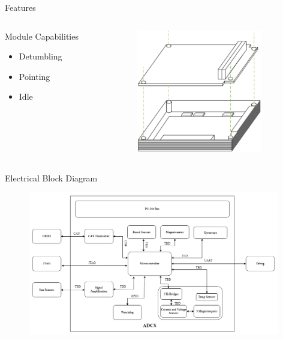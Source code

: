 \documentclass{beamer}
\begin{document}
\begin{frame}{Features}
    \begin{columns}[t]
        \begin{column}[t]{0.5\textwidth}
        \item Module Capabilities
        \vspace{0.3cm}
            \begin{itemize}
                \item Detumbling
                \vspace{0.3cm}
                \item Pointing
                \vspace{0.3cm}
                \item Idle
                \vspace{0.3cm}
            \end{itemize}
        \end{column}
        \begin{column}[t]{0.5\textwidth}
            \begin{figure}[!ht]
                \begin{center}
                    \includegraphics[width=5.5cm]{figures/adcs-module-idea.png}
                \end{center}
            \end{figure}
        \end{column}
    \end{columns}
\end{frame}

\begin{frame}{Electrical Block Diagram}

    \begin{figure}[!ht]
        \begin{center}
            \includegraphics[width=11cm]{figures/ADCS-V0.1.drawio.png}
        \end{center}
    \end{figure}

\end{frame}
\end{document}
